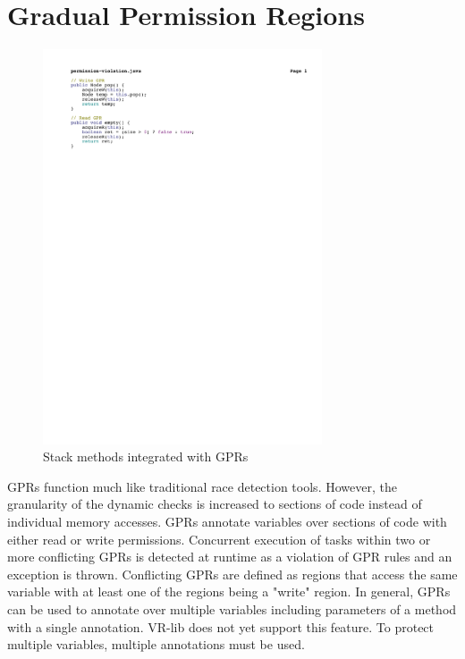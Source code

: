 \section{Gradual Permission Regions}

\begin{figure}[t]
\centering
\includegraphics[width=3.25in]{../figs/gpr.pdf}
\caption{Stack methods integrated with GPRs}
\label{fig:gpr-read-write}
\end{figure}

GPRs function much like traditional race detection
tools\cite{Westbrook:2011:PRR:2341616.2341627,Westbrook:2012:PPR:2367163.2367201}.
However, the granularity of the dynamic checks is increased to sections of code
instead of individual memory accesses. GPRs annotate variables over sections of
code with either read or write permissions. Concurrent execution of tasks within
two or more conflicting GPRs is detected at runtime as a violation of GPR rules
and an exception is thrown. Conflicting GPRs are defined as regions that access
the same variable with at least one of the regions being a "write" region.  In
general, GPRs can be used to annotate over multiple variables including
parameters of a method with a single annotation. VR-lib does not yet support
this feature. To protect multiple variables, multiple annotations must be used.

